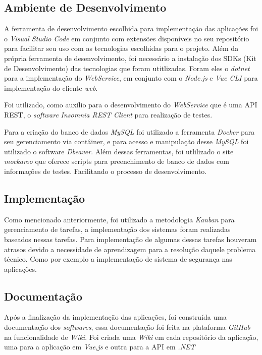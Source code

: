 \documentclass[12pt]{article}
\begin{document}
\subsection{Ambiente de Desenvolvimento}

A ferramenta de desenvolvimento escolhida para implementação
das aplicações foi o \textit{Visual Studio Code} em conjunto com extensões disponíveis
no seu repositório para facilitar seu uso com as tecnologias escolhidas para o projeto. Além
da própria ferramenta de desenvolvimento, foi necessário a instalação dos SDKs
(Kit de Desenvolvimento) das tecnologias que foram utitlizadas. Foram eles o \textit{dotnet} para a implementação do \textit{WebService},
em conjunto com o \textit{Node.js} e \textit{Vue CLI} para implementação do cliente \textit{web}.

Foi utilizado, como auxílio para o desenvolvimento do \textit{WebService} que é uma API REST, o
\textit{software} \textit{Insomnia REST Client} para realização de testes.

Para a criação do banco de dados \textit{MySQL} foi utilizado a ferramenta \textit{Docker} para
seu gerenciamento via contâiner, e para acesso e manipulação desse \textit{MySQL} foi utilizado o software \textit{Dbeaver}.
Além dessas ferramentas, foi utlilizado o site \textit{mockaroo} que oferece scripts para preenchimento
de banco de dados com informações de testes. Facilitando o processo de desenvolvimento.

\subsection{Implementação}

Como mencionado anteriormente, foi utilizado a metodologia \textit{Kanban} para gerenciamento
de tarefas, a implementação dos sistemas foram realizadas baseados nessas tarefas.
Para implementação de algumas dessas tarefas houveram atrasos devido a necessidade de aprendizagem
para a resolução daquele problema técnico. Como por exemplo a implementação de sistema de segurança nas aplicações.

\subsection{Documentação}

Após a finalização da implementação das aplicações, foi construída uma documentação
dos \textit{softwares}, essa documentação foi feita na plataforma \textit{GitHub} na funcionalidade
de \textit{Wiki}. Foi criada uma \textit{Wiki} em cada repositório da aplicação, uma para a aplicação em \textit{Vue,js}
e outra para a API em \textit{.NET}
\end{document}
